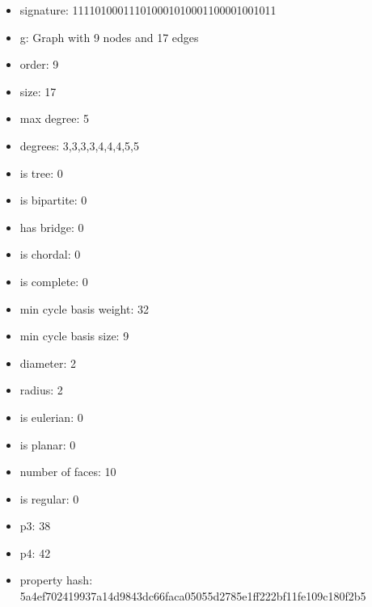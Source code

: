 \newpage
\begin{figure}
\end{figure}
\begin{itemize}
\item signature: 111101000111010001010001100001001011
\item g: Graph with 9 nodes and 17 edges
\item order: 9
\item size: 17
\item max degree: 5
\item degrees: 3,3,3,3,4,4,4,5,5
\item is tree: 0
\item is bipartite: 0
\item has bridge: 0
\item is chordal: 0
\item is complete: 0
\item min cycle basis weight: 32
\item min cycle basis size: 9
\item diameter: 2
\item radius: 2
\item is eulerian: 0
\item is planar: 0
\item number of faces: 10
\item is regular: 0
\item p3: 38
\item p4: 42
\item property hash: 5a4ef702419937a14d9843dc66faca05055d2785e1ff222bf11fe109c180f2b5
\end{itemize}
